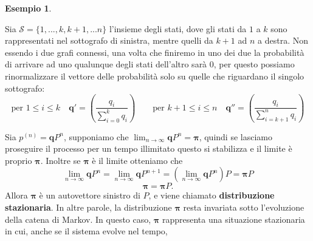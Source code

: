 \documentclass{article}
\theoremstyle{definition}
\theoremstyle{definition}
\newtheorem{example}[theorem]{Esempio}
\theoremstyle{remark}
\begin{document}
\begin{example}
\begin{center}

    \end{center}
    Sia $\mathcal{S}=\{1,...,k,k+1,...n\}$
    l'insieme degli stati, dove gli stati da $1$ a $k$ sono rappresentati nel sottografo di sinistra, mentre quelli da $k+1$ ad $n$ a destra.
    Non essendo  i due grafi connessi, una volta che finiremo in uno dei due la probabilità di arrivare ad uno
    qualunque degli stati dell'altro sarà $0$, per questo possiamo rinormalizzare il vettore delle probabilità solo su quelle che riguardano il singolo
    sottografo:
    $$\text{per $1\le i\le k$}\quad \mathbf{q'}=\left(\frac{q_i}{\sum_{i=0}^k q_i}\right) \qquad \text{per $k+1\le i\le n$}\quad \mathbf{q''}=\left(\frac{q_i}{\sum_{i=k+1}^n q_i}\right)$$
\end{example}
Sia $p^{(n)} = \boldsymbol{q}P^n$, supponiamo che $\lim_{n\to\infty}\boldsymbol{q}P^n = \boldsymbol{\pi} $, quindi se lasciamo proseguire il processo
per un tempo illimitato questo si stabilizza e il limite è proprio $\boldsymbol{\pi}$. Inoltre se $\boldsymbol{\pi}$ è il limite otteniamo che
$$\lim_{n\to \infty} \boldsymbol{q}P^n = \lim_{n\to \infty} \boldsymbol{q}P^{n+1} = (\lim_{n\to \infty} \boldsymbol{q}P^n)P = \boldsymbol{\pi} P$$
$$\boldsymbol{\pi}=\boldsymbol{\pi} P.$$
Allora $\boldsymbol{\pi}$ è un autovettore sinistro di $P$, e viene chiamato \textbf{distribuzione stazionaria}. In altre parole,
la distribuzione $\boldsymbol{\pi}$ resta invariata sotto l'evoluzione della catena di Markov. In questo caso, $\boldsymbol{\pi}$ rappresenta una situazione stazionaria in cui, anche se il sistema evolve nel tempo,
\end{document}

